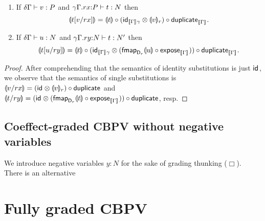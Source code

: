 \documentclass[acmsmall,review,anonymous]{acmart}\settopmatter{printfolios=true,printccs=false,printacmref=false}
\newcommand{\graybox}[1]{\grayboxtext{$#1$}}
\begin{document}
\begin{corollary}
  \label{cor:semsinglesub}
  \bla
  \begin{enumerate}
  \item If $\qValTy \delta \Gamma v P$ and
      $\oCompTy {\qext \gamma \Gamma r x P} t {N}$
      then
\[
  \dent{\qsubst v r x t} = \dent t
    \comp (\tid[\den\Gamma \gamma] \otimes \denv v r)
    \comp \duplicate[\den\Gamma]
  .
\]
  \item If $\qCompTy \delta \Gamma u N$ and
      $\oCompTy {\qext \gamma \Gamma r y N} t {N'}$ then
\[
  \dent{\qsubst u r y t} = \dent t
    \comp (\tid[\den\Gamma \gamma]
             \otimes (\fmapt[{\D[r]}] \dent u \comp \expose[\den\Gamma]))
    \comp \duplicate[\den\Gamma]
  .
\]
  \end{enumerate}
\end{corollary}
\begin{proof}
  After comprehending that the semantics of identity substitutions is
  just $\tid$, we observe that the semantics of single substitutions
  is $\dent {v/rx} = (\tid \otimes \denv v r) \comp \duplicate$ and
  $\dent {t/ry} = (\tid \otimes (\fmapt[{\D[r]}]{\dent t} \comp \expose[{\den\Gamma}])) \comp
  \duplicate$, resp.
\end{proof}


\subsection{Coeffect-graded CBPV without negative variables}

We introduce negative variables $y : N$ for the sake of grading thunking ($\Box$).  There is an alternative


\section{Fully graded CBPV}
\label{sec:full-cbpv}

\newcommand{\peCompTy}[5]{(#1)#2 \vdash #3 : #5 \mid #4}
\newcommand{\qeCompTy}[5]{#1#2 \vdash #3 : #5 \mid #4}
\newcommand{\eext}[4]{#1\mathbin.#2:#4|#3}
\newcommand{\qeext}[6]{#1#2\mathbin.#3#4:#6|#5}

\newcommand{\gCompTy}[4]{\CompTy{#1}{#2}{\graybox{#3}}{#4}}
\newcommand{\gpeCompTy}[5]{(#1)#2 \vdash #3 : #5 \mid {\graybox{#4}}}
\newcommand{\gqeCompTy}[5]{#1#2 \vdash #3 : #5 \mid {\graybox{#4}}}
\newcommand{\gthunkty}[2]{\thunkty{\graybox{#1}}{#2}}
\newcommand{\geext}[4]{\eext{#1}{#2}{\graybox{#3}}{#4}}
\newcommand{\gqeext}[6]{\qeext{#1}{#2}{#3}{#4}{\graybox{#5}}{#6}}
\end{document}
